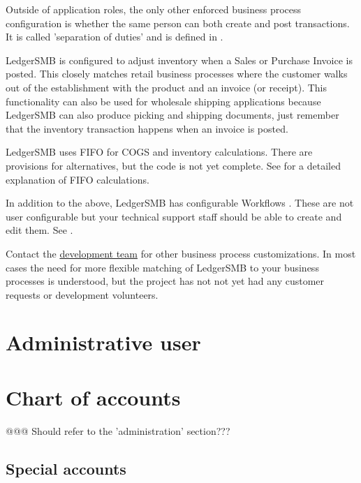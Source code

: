 Outside of application roles, the only other enforced business process configuration is whether the same person can both create and post transactions. It is called 'separation of duties'  and is defined in .

LedgerSMB is configured to adjust inventory  when a Sales or Purchase Invoice is posted. This closely matches retail business processes where the customer walks out of the establishment with the product and an invoice  (or receipt).  This functionality can also be used for wholesale shipping applications because LedgerSMB can also produce picking  and  shipping documents, just remember that the inventory transaction happens when an invoice is posted.

LedgerSMB uses \gls{FIFO}  for \gls{COGS}  and inventory calculations.  There are provisions for alternatives, but the code is not yet complete. See  for a detailed explanation of  \gls{FIFO} calculations.

In addition to the above, LedgerSMB has configurable Workflows . These are not user configurable but your technical support staff should be able to create and edit them. See .

Contact the \href{https://ledgersmb.org}{development team} for other business process customizations.  In most cases the need for more flexible matching of LedgerSMB to your business processes is understood, but the project has not not yet had any customer requests or development volunteers.

\section{Administrative user}
\label{sec-company-config-admin-user}

\section{Chart of accounts}
\label{sec-company-config-coa}

@@@ Should refer to the 'administration' section???

\subsection{Special accounts}
\label{subsec-company-config-coa-special-accounts}

